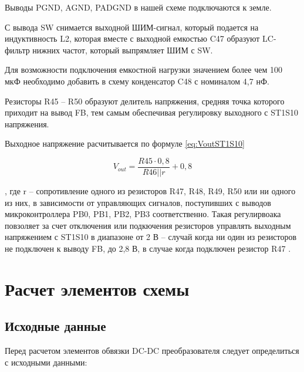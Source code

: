 Выводы PGND, AGND, PADGND в нашей схеме подключаются к земле. 

С вывода SW снимается выходной ШИМ-сигнал, который подается на индуктивность L2, которая вместе с 
выходной емкостью C47 образуют LC-фильтр нижних частот, который выпрямляет ШИМ с SW. 

Для возможности подключения емкостной нагрузки значением более чем 100 мкФ необходимо добавить в схему 
конденсатор C48 с номиналом 4,7 нФ. 

Резисторы R45 -- R50 образуют делитель напряжения, средняя точка которого приходит на вывод FB, тем самым 
обеспечивая регулировку выходного с ST1S10 напряжения. 

Выходное напряжение расчитывается по формуле \ref{eq:VoutST1S10}

\begin{equation}
    V_{out} = \frac{R45 \cdot 0,8}{R46 || r} + 0,8 
    \label{eq:VoutST1S10}
\end{equation}

, где r -- сопротивление одного из резисторов R47, R48, R49, R50 или ни одного из них, 
в зависимости от управляющих сигналов, поступивших с выводов микроконтроллера  PB0, PB1, PB2, PB3 
соответственно. Такая регулирвоака повзоляет за счет отключения или подкючения резисторов управлять 
выходным напряжением с ST1S10 в диапазоне от 2 В -- случай когда ни один из резисторов не подключен к 
выводу FB, до 2,8 В, в случае когда подключен резистор R47 \cite{ST1S10:datasheet}. 


\section{Расчет элементов схемы}
\subsection{Исходные данные}
\hspace{1cm} 

Перед расчетом элементов обвязки DC-DC преобразователя следует определиться с исходными данными:

